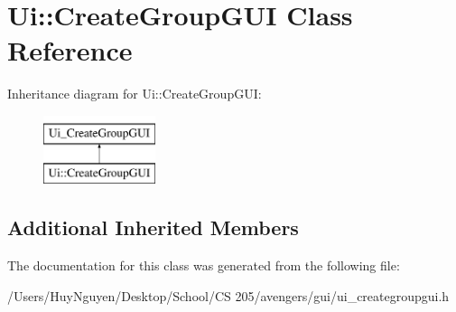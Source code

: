 \hypertarget{classUi_1_1CreateGroupGUI}{}\section{Ui\+:\+:Create\+Group\+G\+UI Class Reference}
\label{classUi_1_1CreateGroupGUI}
Inheritance diagram for Ui\+:\+:Create\+Group\+G\+UI\+:\begin{figure}[H]
\begin{center}
\leavevmode
\includegraphics[height=2.000000cm]{classUi_1_1CreateGroupGUI}
\end{center}
\end{figure}
\subsection*{Additional Inherited Members}


The documentation for this class was generated from the following file\+:\begin{DoxyCompactItemize}
\item 
/\+Users/\+Huy\+Nguyen/\+Desktop/\+School/\+C\+S 205/avengers/gui/ui\+\_\+creategroupgui.\+h\end{DoxyCompactItemize}
